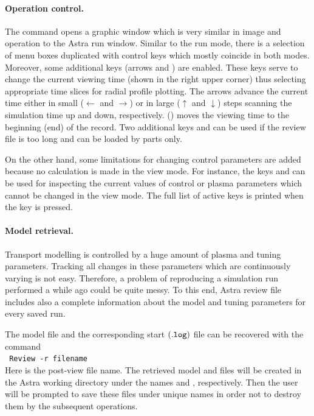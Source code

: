 \paragraph{Operation control.}
The  command opens a graphic window which is very similar in
image and operation to the Astra run window. 
Similar to the run mode, there is a selection of menu boxes duplicated
with control keys which mostly coincide in both modes.
Moreover, some additional keys (arrows and 
  ) are enabled. 
These keys serve to change the current viewing time (shown in the right
upper corner) thus selecting appropriate time slices for radial profile
plotting. 
The arrows advance the current time either in small ($\gets$ and $\to$)
or in large ($\uparrow$ and $\downarrow$) steps scanning the simulation
time up and down, respectively.
 () moves the viewing time to the beginning (end)
of the record. 
Two additional keys  and  can be used if the
review file is too long and can be loaded by parts only.

On the other hand, some limitations for changing control parameters are
added because no calculation is made in the view mode. 
For instance, the keys  and  can be used for
inspecting the current values of control or plasma parameters which
cannot be changed in the view mode.
The full list of active keys is printed when the key  is
pressed. 

\paragraph{Model retrieval.}

Transport modelling is controlled by a huge amount of plasma and tuning
parameters.
Tracking all changes in these parameters which are continuously
varying is not easy.
Therefore, a problem of reproducing a simulation run performed a while
ago could be quite messy.
To this end, Astra review file includes also a complete information
about the model and tuning parameters for every saved run.

The model file and the corresponding start $(\tt.log)$ file can be
recovered with the command
\\{\tt\indent
Review -r file\us name}
\\
Here  is the post-view file name.
The retrieved model and  files will be created in the Astra
working directory  under the names  and
, respectively. 
Then the user will be prompted to save these files under unique names in
order not to destroy them by the subsequent operations.

